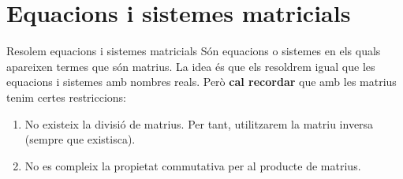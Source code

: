 \documentclass[11pt,a4paper]{article}
\newcommand{\fmuline}[1]{\textbf{\color{fmaccent}#1}}
\begin{document}
\section{Equacions i sistemes matricials}\hypertarget{sec7}{}

\begin{fmprop}{Resolem equacions i sistemes matricials}
Són equacions o sistemes en els quals apareixen termes que són matrius. La idea és que els resoldrem igual que les equacions i sistemes amb nombres reals. Però \fmuline{cal recordar} que amb les matrius tenim certes restriccions:

\begin{enumerate}
\item No existeix la divisió de matrius. Per tant, utilitzarem la matriu inversa (sempre que existisca).
\item No es compleix la propietat commutativa per al producte de matrius.
\end{enumerate}
\end{fmprop}
\end{document}
